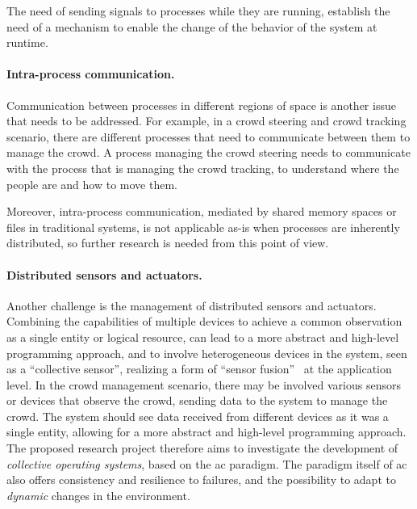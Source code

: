 \documentclass[12pt, a4paper]{article}
\begin{document}
The need of sending signals to processes while they are running,
establish the need of a mechanism to enable the change of the behavior of the system at runtime.

\paragraph{Intra-process communication.}
Communication between processes in different regions of space is another issue that needs to be addressed.
%
For example,
in a crowd steering and crowd tracking scenario,
there are different processes that need to communicate between them to manage the crowd.
%
A process managing the crowd steering needs to communicate with the process that is managing the crowd tracking,
to understand where the people are and how to move them.

Moreover, intra-process communication,
mediated by shared memory spaces or files in traditional systems,
is not applicable as-is when processes are inherently distributed,
so further research is needed from this point of view.

\paragraph{Distributed sensors and actuators.}
Another challenge is the management of distributed sensors and actuators.
%
Combining the capabilities of multiple devices to achieve a common observation as a single entity or logical resource,
can lead to a more abstract and high-level programming approach,
and to involve heterogeneous devices in the system,
seen as a ``collective sensor'',
realizing a form of ``sensor fusion''~\cite{sasiadek2002sensor} at the application level.
%
In the crowd management scenario,
there may be involved various sensors or devices that observe the crowd,
sending data to the system to manage the crowd.
%
The system should see data received from different devices as it was a single entity,
allowing for a more abstract and high-level programming approach.
\\

The proposed research project therefore aims to investigate the development of \emph{collective operating systems},
based on the \ac{ac} paradigm.
%
The paradigm itself of \ac{ac} also offers consistency and resilience to failures,
and the possibility to adapt to \emph{dynamic} changes in the environment.
\end{document}
